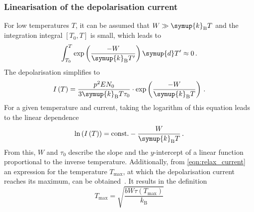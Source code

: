 \subsubsection{Linearisation of the depolarisation current}
For low temperatures $T$, it can be assumed that $W \gg \symup{k}_{\mathrm{B}}T$ and the integration integral $\left[T_0,T\right]$ is small, which leads to
\begin{equation*}
\int_{T_0}^T \exp\left(\frac{-W}{\symup{k}_{\mathrm{B}}T'}\right)\symup{d}T' \approx 0\,.
\end{equation*}
The depolarisation simplifies to
\begin{equation*}
    I\left(T\right) = \frac{p^2EN_0}{3\symup{k}_{\mathrm{B}}T\tau_0}\cdot\exp\left(\frac{-W}{\symup{k}_{\mathrm{B}}T}\right)\,.
\end{equation*}
For a given temperature and current, taking the logarithm of this equation leads to the linear dependence
\begin{equation}
    \ln{\left(I\left(T\right)\right)} = \text{const.} - \frac{W}{\symup{k}_{\mathrm{B}}T}\,.
    \label{eqn:lin_i}
\end{equation}
From this, $W$ and $\tau_0$ describe the slope and the $y$-intercept of a linear function proportional to the inverse temperature.
\newline\noindent
Additionally, from \autoref{eqn:relax_current} an expression for the temperature $T_{\max}$, at which the depolarisation current reaches its maximum, can be obtained~\cite[4]{Fuller}.
It results in the definition
\begin{equation}
    T_{\mathrm{max}} = \sqrt{\frac{b W \tau\left(T_{\mathrm{max}}\right)}{k_{\mathrm{B}}}}
    \label{eqn:Tmax}
\end{equation}
%

